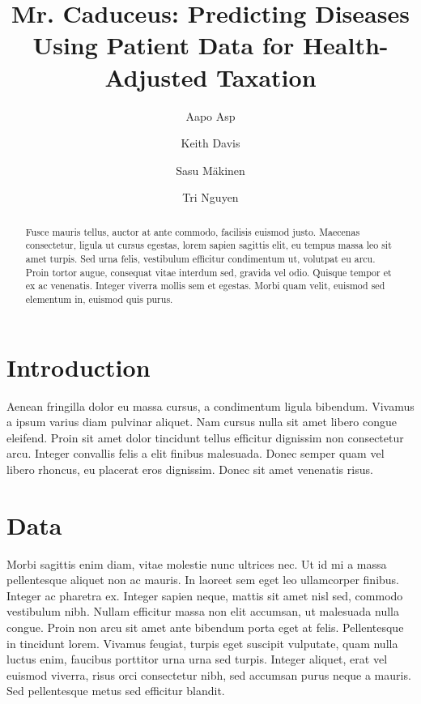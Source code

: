 \documentclass[runningheads]{llncs}
\begin{document}
%
\title{Mr. Caduceus: Predicting Diseases Using Patient Data for Health-Adjusted Taxation }
%
%
\author{Aapo Asp\and
Keith Davis \and
Sasu M{\"a}kinen \and
Tri Nguyen}
%
%

\maketitle              %
%
\begin{abstract}
Fusce mauris tellus, auctor at ante commodo, facilisis euismod justo. Maecenas consectetur, ligula ut cursus egestas, lorem sapien sagittis elit, eu tempus massa leo sit amet turpis. Sed urna felis, vestibulum efficitur condimentum ut, volutpat eu arcu. Proin tortor augue, consequat vitae interdum sed, gravida vel odio. Quisque tempor et ex ac venenatis. Integer viverra mollis sem et egestas. Morbi quam velit, euismod sed elementum in, euismod quis purus.

\end{abstract}
%
%
%
\section{Introduction}
Aenean fringilla dolor eu massa cursus, a condimentum ligula bibendum. Vivamus a ipsum varius diam pulvinar aliquet. Nam cursus nulla sit amet libero congue eleifend. Proin sit amet dolor tincidunt tellus efficitur dignissim non consectetur arcu. Integer convallis felis a elit finibus malesuada. Donec semper quam vel libero rhoncus, eu placerat eros dignissim. Donec sit amet venenatis risus.

\section{Data}
Morbi sagittis enim diam, vitae molestie nunc ultrices nec. Ut id mi a massa pellentesque aliquet non ac mauris. In laoreet sem eget leo ullamcorper finibus. Integer ac pharetra ex. Integer sapien neque, mattis sit amet nisl sed, commodo vestibulum nibh. Nullam efficitur massa non elit accumsan, ut malesuada nulla congue. Proin non arcu sit amet ante bibendum porta eget at felis. Pellentesque in tincidunt lorem. Vivamus feugiat, turpis eget suscipit vulputate, quam nulla luctus enim, faucibus porttitor urna urna sed turpis. Integer aliquet, erat vel euismod viverra, risus orci consectetur nibh, sed accumsan purus neque a mauris. Sed pellentesque metus sed efficitur blandit.
\end{document}
